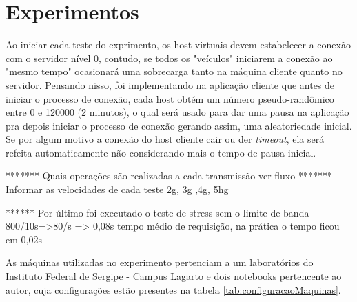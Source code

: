 \documentclass[
	12pt,				%
	oneside,			%
	a4paper,			%
	english,			%
	brazil				%
	]{abntex2ppgsi}
\begin{document}
\section{Experimentos}

Ao iniciar cada teste do exprimento, os host virtuais devem estabelecer a conexão com o servidor nível 0, contudo, se todos os "veículos" iniciarem a conexão ao "mesmo tempo" ocasionará uma sobrecarga tanto na máquina cliente quanto no servidor. Pensando nisso, foi implementando na aplicação cliente que antes de iniciar o processo de conexão, cada host obtém um número pseudo-randômico entre 0 e 120000 (2 minutos), o qual será usado para dar uma pausa na aplicação pra depois iniciar o processo de conexão gerando assim, uma aleatoriedade inicial. Se por algum motivo a conexão do host cliente cair ou der \textit{timeout}, ela será refeita automaticamente não considerando mais o tempo de pausa inicial. 

******* Quais operações são realizadas a cada transmissão ver fluxo
******* Informar as velocidades de cada teste 2g, 3g ,4g, 5hg

****** Por último foi executado o teste de stress sem o limite de banda - 800/10s=>80/s => 0,08s tempo médio de requisição, na prática o tempo ficou em 0,02s

As máquinas utilizadas no experimento pertenciam a um laboratórios do Instituto Federal de Sergipe - Campus Lagarto e dois notebooks pertencente ao autor, cuja configurações estão presentes na tabela \ref{tab:configuracaoMaquinas}.
\end{document}
